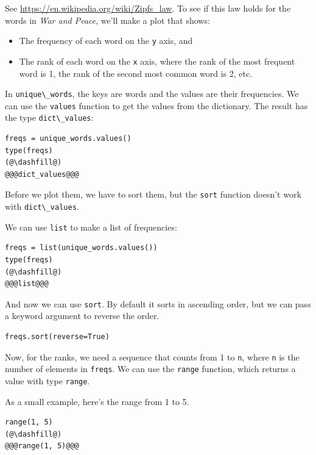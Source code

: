 See \url{https://en.wikipedia.org/wiki/Zipfs_law}. To see if this law
holds for the words in \emph{War and Peace}, we'll make a plot that
shows:

\begin{itemize}
\item
  The frequency of each word on the \passthrough{\lstinline!y!} axis,
  and
\item
  The rank of each word on the \passthrough{\lstinline!x!} axis, where
  the rank of the most frequent word is 1, the rank of the second most
  common word is 2, etc.
\end{itemize}

In \passthrough{\lstinline!unique\_words!}, the keys are words and the
values are their frequencies. We can use the
\passthrough{\lstinline!values!} function to get the values from the
dictionary. The result has the type
\passthrough{\lstinline!dict\_values!}:

\begin{lstlisting}[]
freqs = unique_words.values()
type(freqs)
(@\dashfill@)
@@@dict_values@@@
\end{lstlisting}

Before we plot them, we have to sort them, but the
\passthrough{\lstinline!sort!} function doesn't work with
\passthrough{\lstinline!dict\_values!}.

We can use \passthrough{\lstinline!list!} to make a list of frequencies:

\begin{lstlisting}[]
freqs = list(unique_words.values())
type(freqs)
(@\dashfill@)
@@@list@@@
\end{lstlisting}

And now we can use \passthrough{\lstinline!sort!}. By default it sorts
in ascending order, but we can pass a keyword argument to reverse the
order.

\begin{lstlisting}[]
freqs.sort(reverse=True)
\end{lstlisting}

Now, for the ranks, we need a sequence that counts from 1 to
\passthrough{\lstinline!n!}, where \passthrough{\lstinline!n!} is the
number of elements in \passthrough{\lstinline!freqs!}. We can use the
\passthrough{\lstinline!range!} function, which returns a value with
type \passthrough{\lstinline!range!}.

As a small example, here's the range from 1 to 5.

\begin{lstlisting}[]
range(1, 5)
(@\dashfill@)
@@@range(1, 5)@@@
\end{lstlisting}

